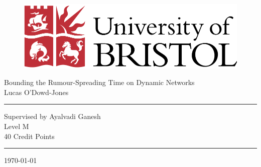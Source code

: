 \begin{titlepage}
\thispagestyle{empty}

\begin{figure}[h]
\begin{center}
\includegraphics[scale=0.5]{graphics/uob_logo.pdf} %
\end{center}
\end{figure}

\begin{center}
{\Large Bounding the Rumour-Spreading Time on Dynamic Networks\\ \vspace{1cm}Lucas O'Dowd-Jones}
\end{center}

\vspace{3cm}
\hrule
\begin{center}
Supervised by Ayalvadi Ganesh\\
Level M\\
40 Credit Points
\end{center}
\hrule

\vspace{3cm}
\begin{center}
\today
\end{center}

\end{titlepage}
